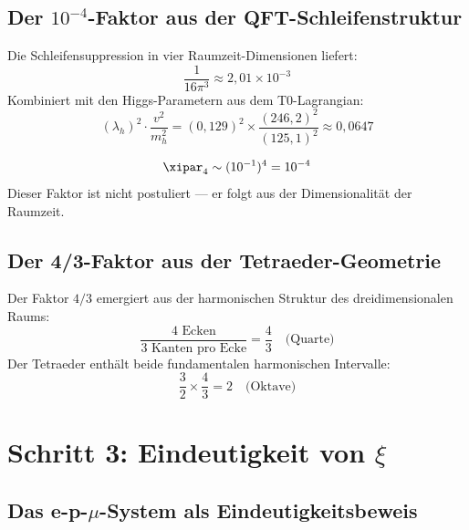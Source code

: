 \subsection{Der \texorpdfstring{$10^{-4}$}{10^(-4)}-Faktor aus der QFT-Schleifenstruktur}

Die Schleifensuppression in vier Raumzeit-Dimensionen liefert:
\begin{equation}
	\frac{1}{16\pi^3} \approx 2{,}01 \times 10^{-3}
\end{equation}
Kombiniert mit den Higgs-Parametern aus dem T0-Lagrangian:
\begin{equation}
	(\lambda_h)^2 \cdot \frac{v^2}{m_h^2} = (0{,}129)^2 \times \frac{(246{,}2)^2}{(125{,}1)^2} \approx 0{,}0647
\end{equation}

\begin{keyresult}
\begin{equation}
	\xipar_4 \sim (10^{-1})^4 = 10^{-4}
\end{equation}
Dieser Faktor ist nicht postuliert — er folgt aus der Dimensionalität der Raumzeit.
\end{keyresult}

\subsection{Der 4/3-Faktor aus der Tetraeder-Geometrie}

Der Faktor $4/3$ emergiert aus der harmonischen Struktur des dreidimensionalen Raums:
\begin{equation}
	\frac{4 \text{ Ecken}}{3 \text{ Kanten pro Ecke}} = \frac{4}{3} \quad \text{(Quarte)}
\end{equation}
Der Tetraeder enthält beide fundamentalen harmonischen Intervalle:
\begin{equation}
	\frac{3}{2} \times \frac{4}{3} = 2 \quad \text{(Oktave)}
\end{equation}

\section{Schritt 3: Eindeutigkeit von \texorpdfstring{$\xi$}{xi}}

\subsection{Das e-p-\texorpdfstring{$\mu$}{mu}-System als Eindeutigkeitsbeweis}

